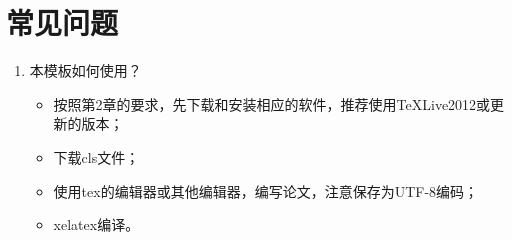 \chapter{常见问题}
\label{chapter-faq}
\begin{enumerate}
\item 本模板如何使用？
\label{faq-howtouse}
\begin{itemize}
	\item 按照第2章的要求，先下载和安装相应的软件，推荐使用\TeX{}Live2012或更新的版本；
	\item 下载cls文件；
	\item 使用tex的编辑器或其他编辑器，编写论文，注意保存为UTF-8编码；
	\item xelatex编译。
\end{itemize}
\end{enumerate}
